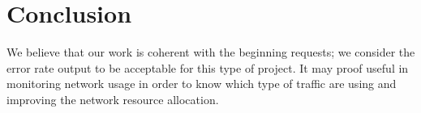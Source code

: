 \documentclass[11pt, USenglish]{article}
\begin{document}
\section{Conclusion}
We believe that our work is coherent with the beginning requests; we consider the error rate output to be acceptable for this type of project. It may proof useful in monitoring network usage in order to know which type of traffic are using and improving the network resource allocation. 

\newpage

\end{document}
